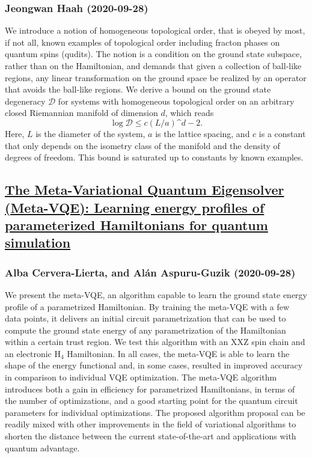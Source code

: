 \subsubsection*{Jeongwan Haah (2020-09-28)}
We introduce a notion of homogeneous topological order, that is obeyed by
most, if not all, known examples of topological order including fracton phases
on quantum spins (qudits). The notion is a condition on the ground state
subspace, rather than on the Hamiltonian, and demands that given a collection
of ball-like regions, any linear transformation on the ground space be realized
by an operator that avoids the ball-like regions. We derive a bound on the
ground state degeneracy $\mathcal D$ for systems with homogeneous topological
order on an arbitrary closed Riemannian manifold of dimension $d$, which reads
\[ \log \mathcal D \le c (L/a)\^{d-2}.\] Here, $L$ is the diameter of the
system, $a$ is the lattice spacing, and $c$ is a constant that only depends on
the isometry class of the manifold and the density of degrees of freedom. This
bound is saturated up to constants by known examples.

\subsection*{\href{http://arxiv.org/abs/2009.13545v1}{The Meta-Variational Quantum Eigensolver (Meta-VQE): Learning energy  profiles of parameterized Hamiltonians for quantum simulation}}
\subsubsection*{Alba Cervera-Lierta, and Alán Aspuru-Guzik (2020-09-28)}
We present the meta-VQE, an algorithm capable to learn the ground state
energy profile of a parametrized Hamiltonian. By training the meta-VQE with a
few data points, it delivers an initial circuit parametrization that can be
used to compute the ground state energy of any parametrization of the
Hamiltonian within a certain trust region. We test this algorithm with an XXZ
spin chain and an electronic H$_{4}$ Hamiltonian. In all cases, the meta-VQE is
able to learn the shape of the energy functional and, in some cases, resulted
in improved accuracy in comparison to individual VQE optimization. The meta-VQE
algorithm introduces both a gain in efficiency for parametrized Hamiltonians,
in terms of the number of optimizations, and a good starting point for the
quantum circuit parameters for individual optimizations. The proposed algorithm
proposal can be readily mixed with other improvements in the field of
variational algorithms to shorten the distance between the current
state-of-the-art and applications with quantum advantage.

